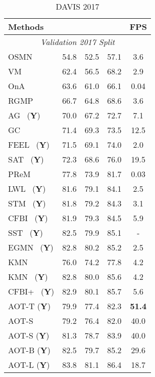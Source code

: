 \documentclass{article}
\begin{document}
\begin{table}[t!]
\begin{subtable}{.45\textwidth}
\caption{DAVIS 2017}\label{tab:full_davis}
\begin{center}
\small
\vspace{-2.3mm}
\setlength{\tabcolsep}{5pt}
\begin{tabular}{l c c c c}
\toprule[1.5pt]
 Methods  &  &  &  & FPS \\
\midrule[1pt]
\multicolumn{5}{c}{\textit{Validation 2017 Split}} \\
\midrule[1pt]
OSMN~\cite{osmn}  &  54.8  & 52.5  & 57.1 & 3.6 \\
VM~\cite{videomatch} & 62.4  & 56.5 & 68.2 & 2.9 \\
OnA~\cite{onavos}    &  63.6  & 61.0  & 66.1 & 0.04 \\
RGMP~\cite{rgmp}    & 66.7 & 64.8   & 68.6 & 3.6 \\
AG~\cite{agame} (\textbf{Y})    & 70.0  &  67.2  & 72.7 & 7.1 \\
GC~\cite{realtimevos2}   & 71.4  & 69.3  & 73.5  & 12.5 \\
FEEL~\cite{feelvos} (\textbf{Y})   &  71.5  &  69.1  & 74.0 & 2.0 \\
SAT~\cite{realtimevos1} (\textbf{Y})  &  72.3 & 68.6  & 76.0  & 19.5 \\
PReM~\cite{premvos}   &  77.8  &  73.9  & 81.7 & 0.03 \\
LWL~\cite{LWLVOS} (\textbf{Y}) &  81.6  & 79.1  & 84.1 & 2.5 \\
STM~\cite{spacetime} (\textbf{Y})  &  81.8  & 79.2  & 84.3 & 3.1 \\
CFBI~\cite{cfbi} (\textbf{Y}) &  81.9  & 79.3  & 84.5 & 5.9 \\
SST~\cite{sstvos} (\textbf{Y}) &  82.5  & 79.9  & 85.1 & - \\
EGMN~\cite{EGMN} (\textbf{Y})  &  82.8  & 80.2  & 85.2 & 2.5 \\
KMN~\cite{KMN}  &  76.0  & 74.2  & 77.8 & 4.2 \\
KMN~\cite{KMN} (\textbf{Y}) &  82.8  & 80.0  & 85.6 & 4.2 \\
CFBI+~\cite{cfbip} (\textbf{Y}) &  82.9  & 80.1  & 85.7 & 5.6 \\
\hline
AOT-T (\textbf{Y}) & 79.9 & 77.4 & 82.3 & \textbf{51.4} \\
AOT-S  &  79.2  & 76.4 & 82.0 & 40.0 \\
AOT-S (\textbf{Y}) & 81.3 & 78.7 & 83.9 & {40.0} \\
AOT-B (\textbf{Y}) & 82.5 & 79.7 & 85.2 & 29.6 \\
AOT-L (\textbf{Y}) & {83.8} & {81.1} & {86.4} & 18.7 \\

\end{tabular}
\end{center}
\end{subtable}
\end{table}
\end{document}
